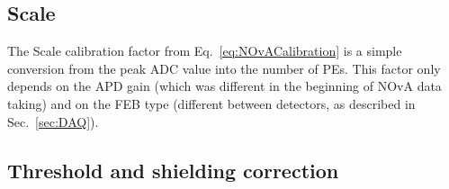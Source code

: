 
\subsection{Scale}
The Scale calibration factor from Eq.~\ref{eq:NOvACalibration} is a simple conversion from the peak \gls{ADC} value into the number of \gls{PE}s. This factor only depends on the \gls{APD} gain (which was different in the beginning of \gls{NOvA} data taking) and on the FEB type (different between detectors, as described in Sec.~\ref{sec:DAQ}).

\subsection{Threshold and shielding correction}

